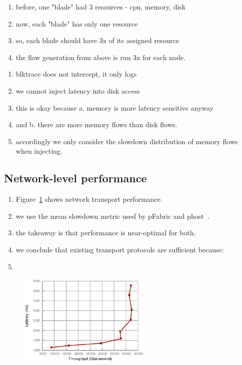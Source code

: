\begin{enumerate}
\item before, one "blade" had 3 resources - cpu, memory, disk
\item now, each "blade" has only one resource
\item so, each blade should have 3x of its assigned resource
\item the flow generation from above is run 3x for each node.
\end{enumerate}

\begin{enumerate}
\item blktrace does not intercept, it only logs
\item we cannot inject latency into disk access
\item this is okay because a. memory is more latency sensitive anyway 
\item and b. there are more memory flows than disk flows.
\item accordingly we only consider the slowdown distribution of memory flows when injecting.
\end{enumerate}

\subsection{Network-level performance}
\begin{enumerate}
\item Figure~\ref{fig:phostp} shows network transport performance.
\item we use the mean slowdown metric used by pFabric and phost~\cite{pfabric, phost}.
\item the takeaway is that performance is near-optimal for both.
\item we conclude that existing transport protocols are sufficient because:
\item {}
\end{enumerate}
\label{ssec:nlp}

%
\begin{figure}
  \centering
    \includegraphics[width = 2.5in]{img/thvsla_get} 
  \caption{\small{}}
  \label{fig:phostp}
\end{figure}
%


